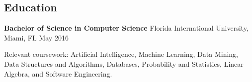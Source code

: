 \documentclass[10pt,letterpaper]{article}
\begin{document}
\subsection{Education}\label{education}

\fontsize{9.5}{10.4}\selectfont\color{ResumeEduSecondary}\setlength{\parskip}{1.25pt}
\renewcommand{\textbf}[1]{\textcolor{ResumeBody}{\bfseries #1}}

\textbf{Bachelor of Science in Computer Science} \textbar{} Florida
International University, Miami, FL \textbar{} May 2016

\color{ResumeBody}

Relevant coursework: Artificial Intelligence, Machine Learning, Data
Mining, Data Structures and Algorithms, Databases, Probability and
Statistics, Linear Algebra, and Software Engineering.
\end{document}
